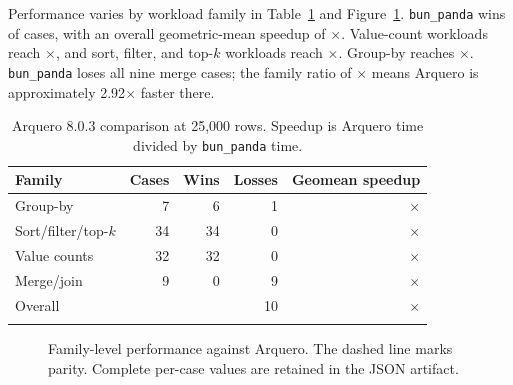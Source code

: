 \documentclass[pdflatex,sn-basic,Numbered]{sn-jnl}
\begin{document}
Performance varies by workload family in Table~\ref{tab:arquero} and Figure~\ref{fig:families}. \texttt{bun\_panda} wins \ArqueroWins{} of \ArqueroCases{} cases, with an overall geometric-mean speedup of \ArqueroGeoSpeedup{}$\times$. Value-count workloads reach \CountsGeoSpeedup{}$\times$, and sort, filter, and top-$k$ workloads reach \SortGeoSpeedup{}$\times$. Group-by reaches \GroupbyGeoSpeedup{}$\times$. \texttt{bun\_panda} loses all nine merge cases; the family ratio of \MergeGeoSpeedup{}$\times$ means Arquero is approximately 2.92$\times$ faster there.

\begin{table}[t]
\caption{Arquero 8.0.3 comparison at 25,000 rows. Speedup is Arquero time divided by \texttt{bun\_panda} time.}\label{tab:arquero}
\begin{tabular}{@{}lrrrr@{}}
\toprule
Family & Cases & Wins & Losses & Geomean speedup \\
\midrule
Group-by & 7 & 6 & 1 & \GroupbyGeoSpeedup{}$\times$ \\
Sort/filter/top-$k$ & 34 & 34 & 0 & \SortGeoSpeedup{}$\times$ \\
Value counts & 32 & 32 & 0 & \CountsGeoSpeedup{}$\times$ \\
Merge/join & 9 & 0 & 9 & \MergeGeoSpeedup{}$\times$ \\
\midrule
Overall & \ArqueroCases{} & \ArqueroWins{} & 10 & \ArqueroGeoSpeedup{}$\times$ \\
\botrule
\end{tabular}
\end{table}

\begin{figure}[t]
\centering
{}
\caption{Family-level performance against Arquero. The dashed line marks parity. Complete per-case values are retained in the JSON artifact.}\label{fig:families}
\end{figure}
\end{document}
